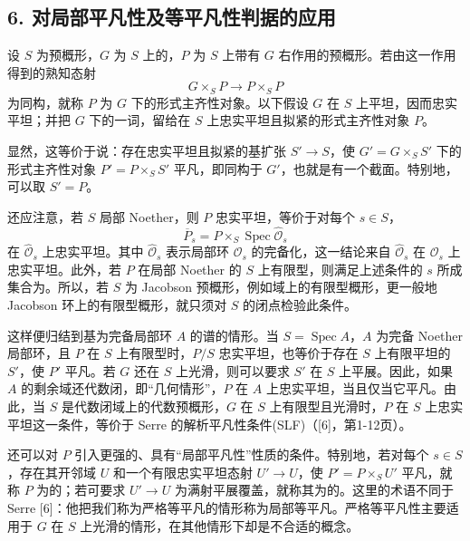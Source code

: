 \subsection*{6. 对局部平凡性及等平凡性判据的应用}
设 $S$ 为预概形，$G$ 为 $S$ 上的，$P$ 为 $S$ 上带有 $G$ 右作用的预概形。若由这一作用得到的熟知态射
\[
G\times_SP\longrightarrow P\times_SP
\]
为同构，就称 $P$ 为 $G$ 下的形式主齐性对象。以下假设 $G$ 在 $S$ 上平坦，因而忠实平坦；并把 $G$ 下的一词，留给在 $S$ 上忠实平坦且拟紧的形式主齐性对象 $P$。

显然，这等价于说：存在忠实平坦且拟紧的基扩张 $S'\to S$，使 $G'=G\times_SS'$ 下的形式主齐性对象 $P'=P\times_SS'$ 平凡，即同构于 $G'$，也就是有一个截面。特别地，可以取 $S'=P$。

还应注意，若 $S$ 局部 Noether，则 $P$ 忠实平坦，等价于对每个 $s\in S$，
\[
\overline P_s=P\times_S\operatorname{Spec}\widehat{\mathcal O}_s
\]
在 $\widehat{\mathcal O}_s$ 上忠实平坦。其中 $\widehat{\mathcal O}_s$ 表示局部环 $\mathcal O_s$ 的完备化，这一结论来自 $\widehat{\mathcal O}_s$ 在 $\mathcal O_s$ 上忠实平坦。此外，若 $P$ 在局部 Noether 的 $S$ 上有限型，则满足上述条件的 $s$ 所成集合为。所以，若 $S$ 为 Jacobson 预概形，例如域上的有限型概形，更一般地 Jacobson 环上的有限型概形，就只须对 $S$ 的闭点检验此条件。

这样便归结到基为完备局部环 $A$ 的谱的情形。当 $S=\operatorname{Spec}A$，$A$ 为完备 Noether 局部环，且 $P$ 在 $S$ 上有限型时，$P/S$ 忠实平坦，也等价于存在 $S$ 上有限平坦的 $S'$，使 $P'$ 平凡。若 $G$ 还在 $S$ 上光滑，则可以要求 $S'$ 在 $S$ 上平展。因此，如果 $A$ 的剩余域还代数闭，即“几何情形”，$P$ 在 $A$ 上忠实平坦，当且仅当它平凡。由此，当 $S$ 是代数闭域上的代数预概形，$G$ 在 $S$ 上有限型且光滑时，$P$ 在 $S$ 上忠实平坦这一条件，等价于 Serre 的解析平凡性条件(SLF)（[6]，第1-12页）。

还可以对 $P$ 引入更强的、具有“局部平凡性”性质的条件。特别地，若对每个 $s\in S$，存在其开邻域 $U$ 和一个有限忠实平坦态射 $U'\to U$，使 $P'=P\times_SU'$ 平凡，就称 $P$ 为的；若可要求 $U'\to U$ 为满射平展覆盖，就称其为的。这里的术语不同于 Serre [6]：他把我们称为严格等平凡的情形称为局部等平凡。严格等平凡性主要适用于 $G$ 在 $S$ 上光滑的情形，在其他情形下却是不合适的概念。

